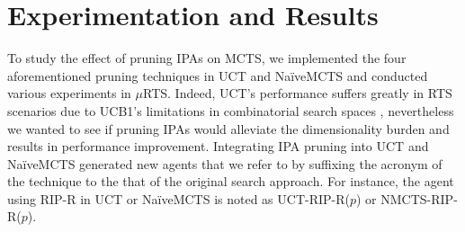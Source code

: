 \documentclass[conference]{IEEEtran}
\newcommand{\mRTS}{$\mu$RTS}
\begin{document}

\begin{center}
\end{center}




\section{Experimentation and Results}
\label{sec:experiments}


To study the effect of pruning IPAs on MCTS, we implemented the four aforementioned pruning techniques in UCT and NaïveMCTS and conducted various experiments in \mRTS{}. Indeed, UCT's performance suffers greatly in RTS scenarios due to UCB1's limitations in combinatorial search spaces \cite{ontanon_combinatorial_2013}, nevertheless we wanted to see if pruning IPAs would alleviate the dimensionality burden and results in performance improvement. Integrating IPA pruning into UCT and NaïveMCTS generated new agents that we refer to by suffixing the acronym of the technique to the that of the original search approach. For instance, the agent using RIP-R in UCT or NaïveMCTS is noted as UCT-RIP-R($p$) or NMCTS-RIP-R($p$).
\end{document}
